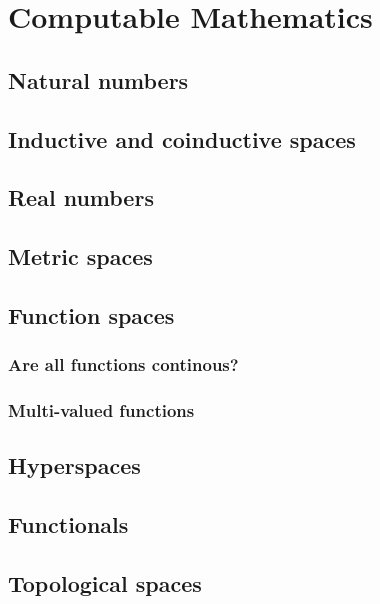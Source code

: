 \chapter{Computable Mathematics}
\label{chap:computable-mathematics}

\section{Natural numbers}
\label{sec:natural-numbers}



\section{Inductive and coinductive spaces}
\label{sec:inductive-coinductive}


\section{Real numbers}
\label{sec:real-numbers}

\section{Metric spaces}
\label{sec:metric-spaces}


\section{Function spaces}
\label{sec:function-spaces}

\subsection{Are all functions continous?}
\label{sec:all-fun-cont}

\subsection{Multi-valued functions}
\label{sec:multi-valued-functions}



\section{Hyperspaces}
\label{sec:hyperspaces}


\section{Functionals}
\label{sec:functionals}


\section{Topological spaces}
\label{sec:topological-spaces}



